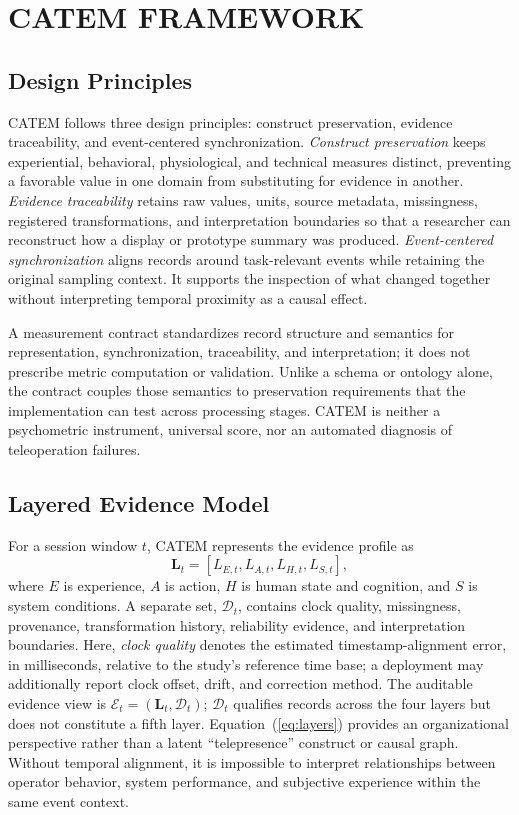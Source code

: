 \documentclass[letterpaper,10pt,conference]{ieeeconf}
\begin{document}
\section{CATEM FRAMEWORK}

\subsection{Design Principles}

CATEM follows three design principles: construct preservation, evidence traceability, and event-centered synchronization. \emph{Construct preservation} keeps experiential, behavioral, physiological, and technical measures distinct, preventing a favorable value in one domain from substituting for evidence in another. \emph{Evidence traceability} retains raw values, units, source metadata, missingness, registered transformations, and interpretation boundaries so that a researcher can reconstruct how a display or prototype summary was produced. \emph{Event-centered synchronization} aligns records around task-relevant events while retaining the original sampling context. It supports the inspection of what changed together without interpreting temporal proximity as a causal effect.

A measurement contract standardizes record structure and semantics for representation, synchronization, traceability, and interpretation; it does not prescribe metric computation or validation. Unlike a schema or ontology alone, the contract couples those semantics to preservation requirements that the implementation can test across processing stages. CATEM is neither a psychometric instrument, universal score, nor an automated diagnosis of teleoperation failures.

\subsection{Layered Evidence Model}

For a session window $t$, CATEM represents the evidence profile as
\begin{equation}
\mathbf{L}_{t}=[L_{E,t},L_{A,t},L_{H,t},L_{S,t}],
\label{eq:layers}
\end{equation}
where $E$ is experience, $A$ is action, $H$ is human state and cognition, and $S$ is system conditions. A separate set, $\mathcal{D}_{t}$, contains clock quality, missingness, provenance, transformation history, reliability evidence, and interpretation boundaries. Here, \emph{clock quality} denotes the estimated timestamp-alignment error, in milliseconds, relative to the study's reference time base; a deployment may additionally report clock offset, drift, and correction method. The auditable evidence view is $\mathcal{E}_{t}=(\mathbf{L}_{t},\mathcal{D}_{t})$; $\mathcal{D}_{t}$ qualifies records across the four layers but does not constitute a fifth layer. Equation~(\ref{eq:layers}) provides an organizational perspective rather than a latent ``telepresence'' construct or causal graph. Without temporal alignment, it is impossible to interpret relationships between operator behavior, system performance, and subjective experience within the same event context.
\end{document}

